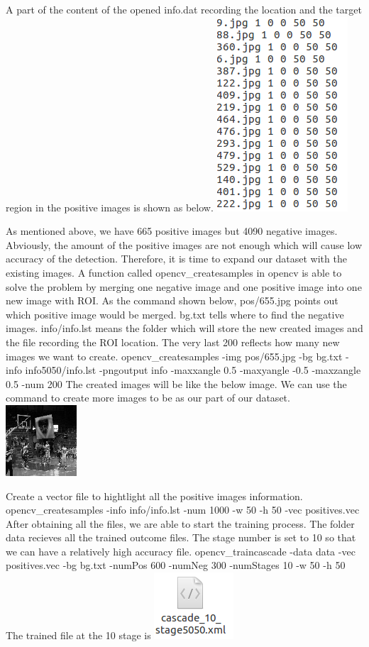 \documentclass[11pt]{article}
\makeatletter
\def\maxwidth{\ifdim\Gin@nat@width>\linewidth\linewidth
    \else\Gin@nat@width\fi}
\let\Oldincludegraphics\includegraphics
\renewcommand{\includegraphics}[1]{\Oldincludegraphics[width=.8\maxwidth]{#1}}
\makeatother
\begin{document}
A part of the content of the opened info.dat recording the location and
the target region in the positive images is shown as below.
\includegraphics{info.png}

    As mentioned above, we have 665 positive images but 4090 negative
images. Abviously, the amount of the positive images are not enough
which will cause low accuracy of the detection. Therefore, it is time to
expand our dataset with the existing images. A function called
opencv\_createsamples in opencv is able to solve the problem by merging
one negative image and one positive image into one new image with ROI.
As the command shown below, pos/655.jpg points out which positive image
would be merged. bg.txt tells where to find the negative images.
info/info.lst means the folder which will store the new created images
and the file recording the ROI location. The very last 200 reflects how
many new images we want to create.
opencv_createsamples -img pos/655.jpg -bg bg.txt -info info5050/info.lst -pngoutput info -maxxangle 0.5 -maxyangle -0.5 -maxzangle 0.5 -num 200
    The created images will be like the below image. We can use the command
to create more images to be as our part of our dataset.
\includegraphics{vc_training/info5050/0001_0037_0012_0036_0036.jpg}

    Create a vector file to hightlight all the positive images information.
opencv_createsamples -info info/info.lst -num 1000 -w 50 -h 50 -vec positives.vec
    After obtaining all the files, we are able to start the training
process. The folder data recieves all the trained outcome files. The
stage number is set to 10 so that we can have a relatively high accuracy
file.
opencv_traincascade -data data -vec positives.vec -bg bg.txt -numPos 600 -numNeg 300 -numStages 10 -w 50 -h 50
    The trained file at the 10 stage is \includegraphics{file.png}
\end{document}
